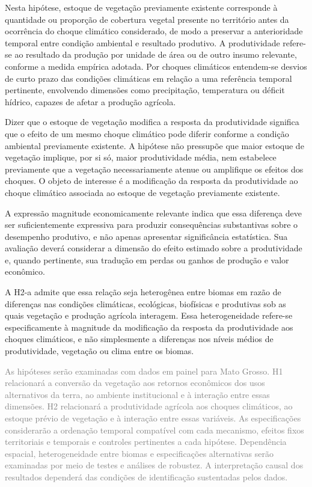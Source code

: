 {\medskip

Nesta hipótese, estoque de vegetação previamente existente corresponde à quantidade ou proporção de cobertura vegetal presente no território antes da ocorrência do choque climático considerado, de modo a preservar a anterioridade temporal entre condição ambiental e resultado produtivo. A produtividade refere-se ao resultado da produção por unidade de área ou de outro insumo relevante, conforme a medida empírica adotada. Por choques climáticos entendem-se desvios de curto prazo das condições climáticas em relação a uma referência temporal pertinente, envolvendo dimensões como precipitação, temperatura ou déficit hídrico, capazes de afetar a produção agrícola.

Dizer que o estoque de vegetação modifica a resposta da produtividade significa que o efeito de um mesmo choque climático pode diferir conforme a condição ambiental previamente existente. A hipótese não pressupõe que maior estoque de vegetação implique, por si só, maior produtividade média, nem estabelece previamente que a vegetação necessariamente atenue ou amplifique os efeitos dos choques. O objeto de interesse é a modificação da resposta da produtividade ao choque climático associada ao estoque de vegetação previamente existente.

A expressão magnitude economicamente relevante indica que essa diferença deve ser suficientemente expressiva para produzir consequências substantivas sobre o desempenho produtivo, e não apenas apresentar significância estatística. Sua avaliação deverá considerar a dimensão do efeito estimado sobre a produtividade e, quando pertinente, sua tradução em perdas ou ganhos de produção e valor econômico.

A H2-a admite que essa relação seja heterogênea entre biomas em razão de diferenças nas condições climáticas, ecológicas, biofísicas e produtivas sob as quais vegetação e produção agrícola interagem. Essa heterogeneidade refere-se especificamente à magnitude da modificação da resposta da produtividade aos choques climáticos, e não simplesmente a diferenças nos níveis médios de produtividade, vegetação ou clima entre os biomas.

\medskip


\textcolor{gray}{As hipóteses serão examinadas com dados em painel para Mato Grosso. H1 relacionará a conversão da vegetação aos retornos econômicos dos usos alternativos da terra, ao ambiente institucional e à interação entre essas dimensões. H2 relacionará a produtividade agrícola aos choques climáticos, ao estoque prévio de vegetação e à interação entre essas variáveis. As especificações considerarão a ordenação temporal compatível com cada mecanismo, efeitos fixos territoriais e temporais e controles pertinentes a cada hipótese. Dependência espacial, heterogeneidade entre biomas e especificações alternativas serão examinadas por meio de testes e análises de robustez. A interpretação causal dos resultados dependerá das condições de identificação sustentadas pelos dados.}

}
